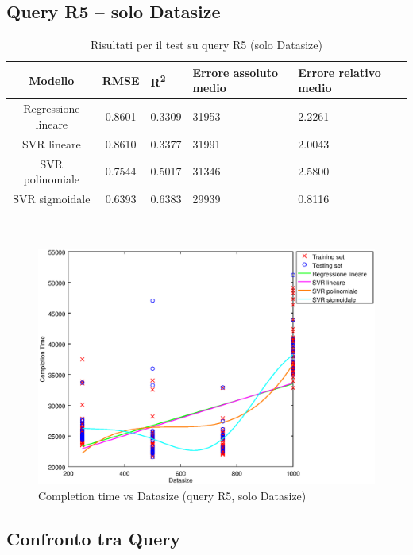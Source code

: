 \documentclass[a4paper,11pt]{article}
\begin{document}
\subsection{Query R5 -- solo Datasize}
\begin{table}[bhpt]
	\centering
	\begin{adjustbox}{center}
		\begin{tabular}{c | c M{1.2cm} M{2.5cm} M{2.5cm} M{1.8cm}}
			Modello & RMSE & R\textsuperscript{2} & Errore assoluto medio & Errore relativo medio \tabularnewline
			\hline
			Regressione lineare & 0.8601 & 0.3309 &  31953 & 2.2261 \\
			SVR lineare & 0.8610 & 0.3377 &  31991 & 2.0043 \\
			SVR polinomiale & 0.7544 & 0.5017 &  31346 & 2.5800 \\
			SVR sigmoidale & 0.6393 & 0.6383 &  29939 & 0.8116 \\
		\end{tabular}
	\end{adjustbox}
	\\
	\caption{Risultati per il test su query R5 (solo Datasize)}
	\label{table_R5_datasize}
\end{table}

\begin {figure}[hbtp]
\centering
\includegraphics[width=\textwidth]{output/R5_SOLO_DATASIZE/plot_R5.eps}
\caption {Completion time vs Datasize (query R5, solo Datasize)}
\end {figure}

\newpage
\subsection{Confronto tra Query}
\end{document}
